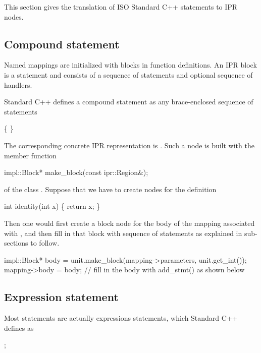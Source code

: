 \documentclass[11pt]{article}
\begin{document}
This section gives the translation of ISO Standard C++ statements to IPR
nodes. 

\subsection{Compound statement}
\label{sec:stmt.compound}

Named mappings are initialized with blocks in function definitions.
An IPR block is a statement and consists of a sequence of statements and
optional sequence of handlers.

Standard C++ defines a compound statement as any brace-enclosed sequence of
statements
\begin{Grammar}
     \{  \}

       
\end{Grammar}

The corresponding concrete IPR representation is .
Such a node is built with the member function
\begin{Program}
  impl::Block* make_block(const ipr::Region&);
\end{Program}
of the class .  Suppose that we have to create nodes for
the definition
\begin{Program}
  int identity(int x) \{ return x; \}
\end{Program}
Then one would first create a block node for the body of the mapping
associated with , and then fill in that block with sequence of
statements as explained in sub-sections to follow.
\begin{Program}
impl::Block* body = unit.make_block(mapping->parameters, unit.get_int());
mapping->body = body;
// fill in the body with add_stmt() as shown below
\end{Program}


\subsection{Expression statement}
\label{sec:stmt.expr}
Most statements are actually expressions statements, which Standard C++ 
defines as
\begin{Grammar}
       ;
\end{Grammar}
\end{document}
